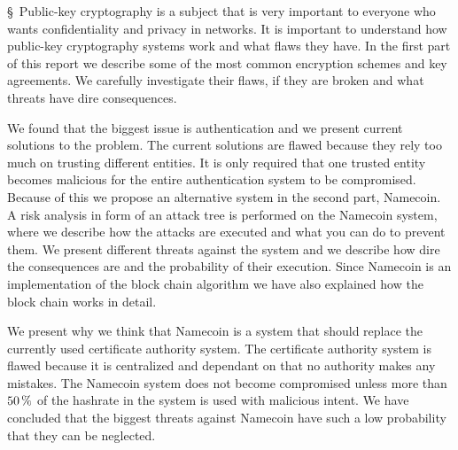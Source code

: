 \documentclass [cropmarks, frame, english, master]{idaexhibitpage}
\author {Tomas Melin and Tomas Vidhall }
\begin{document}
\exhibitpagebeforeabstract 
 \S  \ Public-key cryptography is a subject that is very important to everyone who wants confidentiality and privacy in networks. It is important to understand how public-key cryptography systems work and what flaws they have. In the first part of this report we describe some of the most common encryption schemes and key agreements. We carefully investigate their flaws, if they are broken and what threats have dire consequences. \par \noindent We found that the biggest issue is authentication and we present current solutions to the problem. The current solutions are flawed because they rely too much on trusting different entities. It is only required that one trusted entity becomes malicious for the entire authentication system to be compromised. Because of this we propose an alternative system in the second part, Namecoin. A risk analysis in form of an attack tree is performed on the Namecoin system, where we describe how the attacks are executed and what you can do to prevent them. We present different threats against the system and we describe how dire the consequences are and the probability of their execution. Since Namecoin is an implementation of the block chain algorithm we have also explained how the block chain works in detail. \par \noindent We present why we think that Namecoin is a system that should replace the currently used certificate authority system. The certificate authority system is flawed because it is centralized and dependant on that no authority makes any mistakes. The Namecoin system does not become compromised unless more than $50 \tmspace  +\thinmuskip {.1667em} \%$ of the hashrate in the system is used with malicious intent. We have concluded that the biggest threats against Namecoin have such a low probability that they can be neglected. 
\exhibitpageafterabstract 
\end{document}
